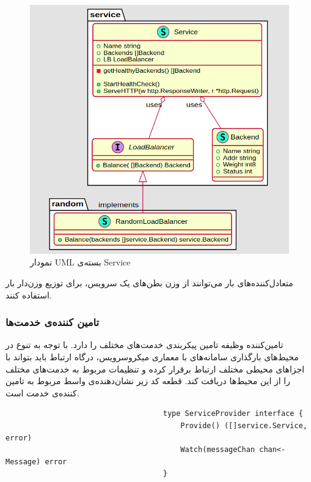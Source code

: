 \begin{figure}[H]
    \centering
    \caption{نمودار UML بسته‌ی Service}
    \label{service_package}
    \includegraphics[scale=0.2]{images/Loadbalance.png}
\end{figure}

متعادل‌کننده‌های بار می‌توانند از وزن بطن‌های یک سرویس، برای توزیع وزن‌دار بار استفاده‌ کنند.


\subsubsection{تامین کننده‌ی خدمت‌ها}
تامین‌کننده‌ وظیفه تامین پیکربندی‌ خدمت‌های مختلف را دارد. با توجه به تنوع در محیط‌های بارگذاری سامانه‌های با معماری میکروسرویس، درگاه ارتباط باید بتواند با اجزاهای محیطی مختلف ارتباط برقرار کرده و تنظیمات مربوط به خدمت‌های مختلف را از این محیط‌ها دریافت کند. قطعه کد زیر نشان‌دهنده‌ی واسط مربوط به تامین کننده‌ی خدمت است.

\begin{latin}
    \begin{lstlisting}
                                    type ServiceProvider interface {
                                        Provide() ([]service.Service, error)
                                        Watch(messageChan chan<- Message) error
                                    }
    \end{lstlisting}
\end{latin}

